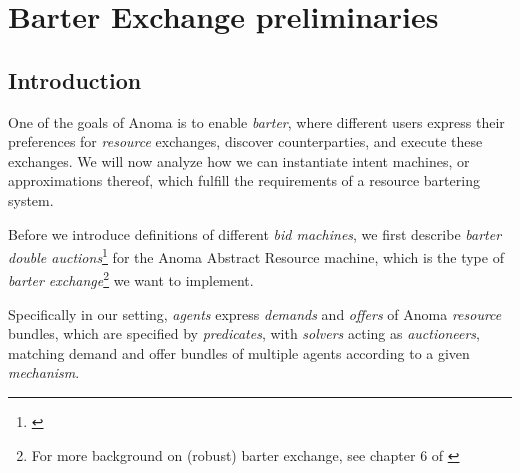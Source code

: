 \section{Barter Exchange preliminaries}\label{sec:barter}

\subsection{Introduction}

One of the goals of Anoma is to enable \textit{barter}, where different users express their preferences for \textit{resource} exchanges, discover counterparties, and execute these exchanges. 
We will now analyze how we can instantiate intent machines, or approximations thereof, which fulfill the requirements of a resource bartering system.

Before we introduce definitions of different \textit{bid machines}, we first describe \textit{barter double auctions}\footnote{\cite{tagiew2009barter}} for the Anoma Abstract Resource machine, which is the type of \textit{barter exchange}\footnote{For more background on (robust) barter exchange, see chapter 6 of \cite{pub:77183}} we want to implement.

Specifically in our setting, \textit{agents} express \textit{demands} and \textit{offers} of Anoma \textit{resource} bundles, which are specified by \textit{predicates}, with \textit{solvers} acting as \textit{auctioneers}, matching demand and offer bundles of multiple agents according to a given \textit{mechanism}.

